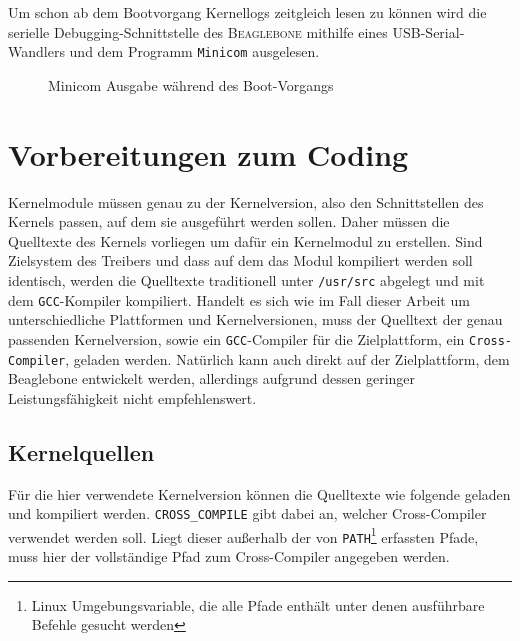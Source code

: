 Um schon ab dem Bootvorgang Kernellogs zeitgleich lesen zu können wird die serielle Debugging-Schnittstelle des \textsc{Beaglebone} mithilfe eines USB-Serial-Wandlers und dem Programm \texttt{Minicom} ausgelesen. 


\begin{figure}[ht]
  \centering
  \caption{Minicom Ausgabe während des Boot-Vorgangs}
  \label{pic:minicom}
\end{figure}

\section{Vorbereitungen zum Coding} %
Kernelmodule müssen genau zu der Kernelversion, also den Schnittstellen des Kernels passen, auf dem sie ausgeführt werden sollen. Daher müssen die Quelltexte des Kernels vorliegen um dafür ein Kernelmodul zu erstellen. Sind Zielsystem des Treibers und dass auf dem das Modul kompiliert werden soll identisch, werden die Quelltexte traditionell unter \texttt{/usr/src} abgelegt und mit dem \texttt{GCC}-Kompiler kompiliert.
Handelt es sich wie im Fall dieser Arbeit um unterschiedliche Plattformen und Kernelversionen, muss der Quelltext der genau passenden Kernelversion, sowie ein \texttt{GCC}-Compiler für die Zielplattform, ein \texttt{Cross-Compiler}, geladen werden. Natürlich kann auch direkt auf der Zielplattform, dem Beaglebone entwickelt werden, allerdings aufgrund dessen geringer Leistungsfähigkeit nicht empfehlenswert.

\subsection{Kernelquellen}
Für die hier verwendete Kernelversion können die Quelltexte wie folgende geladen und kompiliert werden. \texttt{CROSS\_COMPILE} gibt dabei an, welcher Cross-Compiler verwendet werden soll. Liegt dieser außerhalb der von \texttt{PATH}\footnote{Linux Umgebungsvariable, die alle Pfade enthält unter denen ausführbare Befehle gesucht werden} erfassten Pfade, muss hier der vollständige Pfad zum Cross-Compiler angegeben werden.


